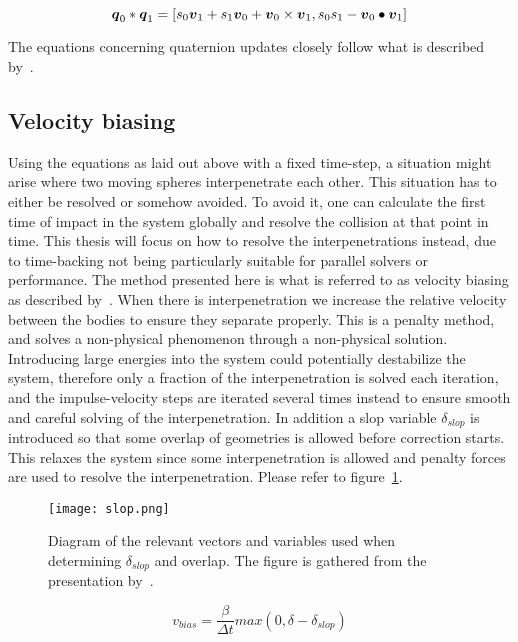 \begin{equation}\label{eq:quatMult}
  \boldsymbol{q}_0*\boldsymbol{q}_1 = [s_0\boldsymbol{v}_1+s_1\boldsymbol{v}_0+\boldsymbol{v}_0\times \boldsymbol{v}_1,s_0s_1-\boldsymbol{v}_0\bullet \boldsymbol{v}_1]
\end{equation}

The equations concerning quaternion updates closely follow what is described by~\cite{fossum}.
\subsection{Velocity biasing}
Using the equations as laid out above with a fixed time-step, a situation might arise
where two moving spheres interpenetrate each other. This situation has to either be resolved or somehow avoided.
To avoid it, one can calculate the first time of impact in the system globally and
resolve the collision at that point in time. This thesis will focus on how to resolve
the interpenetrations instead, due to time-backing not being particularly suitable
for parallel solvers or performance.
The method presented here is what is referred to as velocity biasing as described by~\cite{catto2006}.
When there is interpenetration we increase the relative velocity between the bodies
to ensure they separate properly. This is a penalty method, and solves a non-physical
phenomenon through a non-physical solution. Introducing large energies into the
system could potentially destabilize the system, therefore only a fraction of the
interpenetration is solved each iteration, and the impulse-velocity steps are iterated
several times instead to ensure smooth and careful solving of the interpenetration.
In addition a slop variable $\delta_{slop}$ is introduced so that some overlap of geometries
is allowed before correction starts. This relaxes the system since some interpenetration is
allowed and penalty forces are used to resolve the interpenetration.
Please refer to figure~\ref{fig:slop}.

\begin{figure}[H]
  \centering
  \texttt{[image: slop.png]}
  \caption{Diagram of the relevant vectors and variables used when determining $\delta_{slop}$ and
  overlap. The figure is gathered from the presentation by~\cite{catto2006}.}
  \label{fig:slop}
\end{figure}

\begin{equation}
  v_{bias} = \frac{\beta}{\Delta t}max(0, \delta-\delta_{slop})
\end{equation}

